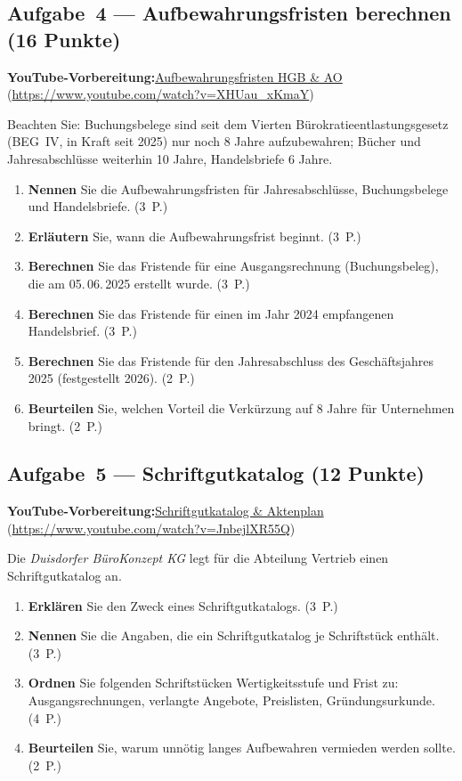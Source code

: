 \documentclass[11pt, a4paper]{article}
\begin{document}
\subsection*{Aufgabe~4 --- Aufbewahrungsfristen berechnen (16 Punkte)}

\noindent\textbf{\color{bfwAccent}YouTube-Vorbereitung:}\enspace \href{https://www.youtube.com/watch?v=XHUau_xKmaY}{Aufbewahrungsfristen HGB \& AO} (\url{https://www.youtube.com/watch?v=XHUau_xKmaY})

\medskip
Beachten Sie: Buchungsbelege sind seit dem Vierten Bürokratieentlastungsgesetz (BEG~IV,
in Kraft seit 2025) nur noch 8 Jahre aufzubewahren; Bücher und Jahresabschlüsse weiterhin
10 Jahre, Handelsbriefe 6 Jahre.

\begin{enumerate}[label=(\alph*)]
  \item \textbf{Nennen} Sie die Aufbewahrungsfristen für Jahresabschlüsse, Buchungsbelege und Handelsbriefe. \hfill (3~P.)
  \item \textbf{Erläutern} Sie, wann die Aufbewahrungsfrist beginnt. \hfill (3~P.)
  \item \textbf{Berechnen} Sie das Fristende für eine Ausgangsrechnung (Buchungsbeleg), die am 05.\,06.\,2025 erstellt wurde. \hfill (3~P.)
  \item \textbf{Berechnen} Sie das Fristende für einen im Jahr 2024 empfangenen Handelsbrief. \hfill (3~P.)
  \item \textbf{Berechnen} Sie das Fristende für den Jahresabschluss des Geschäftsjahres 2025 (festgestellt 2026). \hfill (2~P.)
  \item \textbf{Beurteilen} Sie, welchen Vorteil die Verkürzung auf 8 Jahre für Unternehmen bringt. \hfill (2~P.)
\end{enumerate}

\subsection*{Aufgabe~5 --- Schriftgutkatalog (12 Punkte)}

\noindent\textbf{\color{bfwAccent}YouTube-Vorbereitung:}\enspace \href{https://www.youtube.com/watch?v=JnbejlXR55Q}{Schriftgutkatalog \& Aktenplan} (\url{https://www.youtube.com/watch?v=JnbejlXR55Q})

\medskip
Die \emph{Duisdorfer BüroKonzept KG} legt für die Abteilung Vertrieb einen Schriftgutkatalog an.

\begin{enumerate}[label=(\alph*)]
  \item \textbf{Erklären} Sie den Zweck eines Schriftgutkatalogs. \hfill (3~P.)
  \item \textbf{Nennen} Sie die Angaben, die ein Schriftgutkatalog je Schriftstück enthält. \hfill (3~P.)
  \item \textbf{Ordnen} Sie folgenden Schriftstücken Wertigkeitsstufe und Frist zu: Ausgangsrechnungen, verlangte Angebote, Preislisten, Gründungsurkunde. \hfill (4~P.)
  \item \textbf{Beurteilen} Sie, warum unnötig langes Aufbewahren vermieden werden sollte. \hfill (2~P.)
\end{enumerate}
\end{document}
